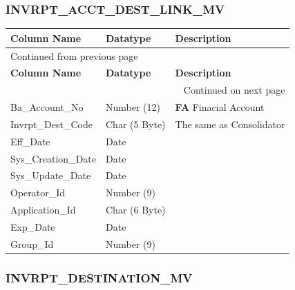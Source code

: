 \documentclass[12pt,twoside]{article}
\begin{document}
\subsubsection{INVRPT\_ACCT\_DEST\_LINK\_MV}
\label{sec:orgheadline155}
\footnotesize

\begin{longtable}{l|l|l}
\hline
\textbf{Column Name} & \textbf{Datatype} & \textbf{Description}\\
\hline
\endfirsthead
\multicolumn{3}{l}{Continued from previous page} \\
\hline

\textbf{Column Name} & \textbf{Datatype} & \textbf{Description} \\

\hline
\endhead
\hline\multicolumn{3}{r}{Continued on next page} \\
\endfoot
\endlastfoot
\hline
Ba\_Account\_No & Number (12) & \textbf{FA} Finacial Account\\
Invrpt\_Dest\_Code & Char (5 Byte) & The same as Consolidator\\
Eff\_Date & Date & \\
Sys\_Creation\_Date & Date & \\
Sys\_Update\_Date & Date & \\
Operator\_Id & Number (9) & \\
Application\_Id & Char (6 Byte) & \\
Exp\_Date & Date & \\
Group\_Id & Number (9) & \\
\hline
\end{longtable}
\normalsize
\subsubsection{INVRPT\_DESTINATION\_MV}
\label{sec:orgheadline156}
\footnotesize
\end{document}
